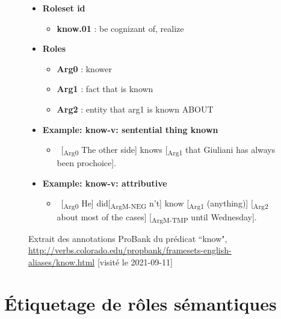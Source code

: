 \documentclass{KodeBook}
\begin{document}
\begin{figure}[ht]
	\centering
\begin{tcolorbox}[boxrule=0.4pt,text width=.85\textwidth, standard jigsaw, opacityback=0,]
	\footnotesize
	\begin{itemize}
		\item \textbf{Roleset id}
		\begin{itemize}\scriptsize
			\item \textbf{know.01} : be cognizant of, realize
		\end{itemize}
		\item \textbf{Roles}
		\begin{itemize}\scriptsize
			\item \textbf{Arg0} : knower
			\item \textbf{Arg1} : fact that is known
			\item \textbf{Arg2} : entity that arg1 is known ABOUT
		\end{itemize}
		
		\item \textbf{Example: know-v: sentential thing known}
		\begin{itemize}\scriptsize
			\item \ [\textsubscript{\color{red}Arg0} The other side] knows [\textsubscript{\color{red}Arg1} that Giuliani has always been prochoice].
		\end{itemize}
		
		\item \textbf{Example: know-v: attributive}
		\begin{itemize}\scriptsize
			\item \ [\textsubscript{\color{red}Arg0} He] did[\textsubscript{\color{red}ArgM-NEG} n't] know [\textsubscript{\color{red}Arg1} (anything)] [\textsubscript{\color{red}Arg2} about most of the cases] [\textsubscript{\color{red}ArgM-TMP} until Wednesday].
		\end{itemize}
	\end{itemize}\vspace*{-1cm}
\end{tcolorbox}
	\caption[Extrait des annotations ProBank d'un prédicat]{Extrait des annotations ProBank du prédicat ``know", \url{http://verbs.colorado.edu/propbank/framesets-english-aliases/know.html} [visité le 2021-09-11]}
	\label{fig:propbank-predicat}
\end{figure}

\section{Étiquetage de rôles sémantiques}
\end{document}
